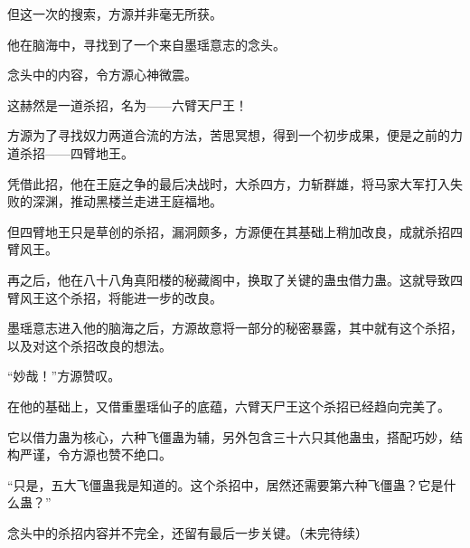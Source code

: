 \begin{this_body}
但这一次的搜索，方源并非毫无所获。

他在脑海中，寻找到了一个来自墨瑶意志的念头。

念头中的内容，令方源心神微震。

这赫然是一道杀招，名为——六臂天尸王！

方源为了寻找奴力两道合流的方法，苦思冥想，得到一个初步成果，便是之前的力道杀招——四臂地王。

凭借此招，他在王庭之争的最后决战时，大杀四方，力斩群雄，将马家大军打入失败的深渊，推动黑楼兰走进王庭福地。

但四臂地王只是草创的杀招，漏洞颇多，方源便在其基础上稍加改良，成就杀招四臂风王。

再之后，他在八十八角真阳楼的秘藏阁中，换取了关键的蛊虫借力蛊。这就导致四臂风王这个杀招，将能进一步的改良。

墨瑶意志进入他的脑海之后，方源故意将一部分的秘密暴露，其中就有这个杀招，以及对这个杀招改良的想法。

“妙哉！”方源赞叹。

在他的基础上，又借重墨瑶仙子的底蕴，六臂天尸王这个杀招已经趋向完美了。

它以借力蛊为核心，六种飞僵蛊为辅，另外包含三十六只其他蛊虫，搭配巧妙，结构严谨，令方源也赞不绝口。

“只是，五大飞僵蛊我是知道的。这个杀招中，居然还需要第六种飞僵蛊？它是什么蛊？”

念头中的杀招内容并不完全，还留有最后一步关键。（未完待续）

\end{this_body}

